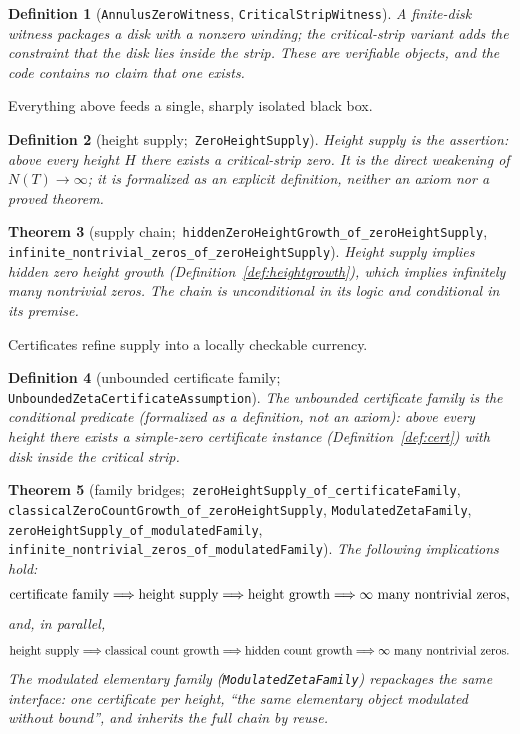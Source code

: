 \documentclass[submission]{jsfds}
\newtheorem{theorem}{Theorem}
\newtheorem{definition}[theorem]{Definition}
\newcommand{\Lean}[1]{\texttt{#1}}
\begin{document}
\begin{definition}[\Lean{AnnulusZeroWitness},
\Lean{CriticalStripWitness}]\label{def:witness}
A \emph{finite-disk witness} packages a disk with a nonzero winding; the
critical-strip variant adds the constraint that the disk lies inside the strip.
These are verifiable objects, and the code contains no claim that one exists.
\end{definition}

Everything above feeds a single, sharply isolated black box.

\begin{definition}[height supply;\,
\Lean{ZeroHeightSupply}]\label{def:supply}
\emph{Height supply} is the assertion: above every height $H$ there exists a
critical-strip zero. It is the direct weakening of $N(T)\to\infty$; it is
formalized as an explicit definition, neither an axiom nor a proved theorem.
\end{definition}

\begin{theorem}[supply chain;\,
\Lean{hiddenZeroHeightGrowth_of_zeroHeightSupply},
\Lean{infinite_nontrivial_zeros_of_zeroHeightSupply}]\label{thm:chain}
Height supply implies hidden zero height growth
(Definition~\ref{def:heightgrowth}), which implies infinitely many nontrivial
zeros. The chain is unconditional in its logic and conditional in its premise.
\end{theorem}

Certificates refine supply into a locally checkable currency.

\begin{definition}[unbounded certificate family;\,
\Lean{UnboundedZetaCertificateAssumption}]\label{deffamily}
The \emph{unbounded certificate family} is the conditional predicate
(formalized as a definition, not an axiom): above every height there exists a
simple-zero certificate instance (Definition~\ref{def:cert}) with disk inside
the critical strip.
\end{definition}

\begin{theorem}[family bridges;\,
\Lean{zeroHeightSupply_of_certificateFamily},
\Lean{classicalZeroCountGrowth_of_zeroHeightSupply},
\Lean{ModulatedZetaFamily},
\Lean{zeroHeightSupply_of_modulatedFamily},
\Lean{infinite_nontrivial_zeros_of_modulatedFamily}]\label{thm:family}
The following implications hold:
\[
  \textup{certificate family}
  \Longrightarrow \textup{height supply}
  \Longrightarrow \textup{height growth}
  \Longrightarrow \infty\text{ many nontrivial zeros},
\]
and, in parallel,
\[
  \textup{height supply}
  \Longrightarrow \textup{classical count growth}
  \Longrightarrow \textup{hidden count growth}
  \Longrightarrow \infty\text{ many nontrivial zeros}.
\]
The \emph{modulated elementary family}
(\Lean{ModulatedZetaFamily}) repackages the same interface: one certificate per
height, ``the same elementary object modulated without bound'', and inherits
the full chain by reuse.
\end{theorem}
\end{document}
